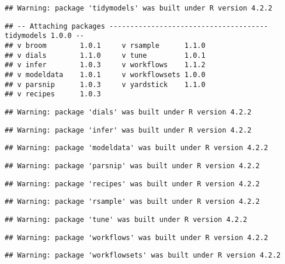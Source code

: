 \documentclass[
]{article}
\begin{document}
\begin{verbatim}
## Warning: package 'tidymodels' was built under R version 4.2.2
\end{verbatim}

\begin{verbatim}
## -- Attaching packages -------------------------------------- tidymodels 1.0.0 --
## v broom        1.0.1     v rsample      1.1.0
## v dials        1.1.0     v tune         1.0.1
## v infer        1.0.3     v workflows    1.1.2
## v modeldata    1.0.1     v workflowsets 1.0.0
## v parsnip      1.0.3     v yardstick    1.1.0
## v recipes      1.0.3
\end{verbatim}

\begin{verbatim}
## Warning: package 'dials' was built under R version 4.2.2
\end{verbatim}

\begin{verbatim}
## Warning: package 'infer' was built under R version 4.2.2
\end{verbatim}

\begin{verbatim}
## Warning: package 'modeldata' was built under R version 4.2.2
\end{verbatim}

\begin{verbatim}
## Warning: package 'parsnip' was built under R version 4.2.2
\end{verbatim}

\begin{verbatim}
## Warning: package 'recipes' was built under R version 4.2.2
\end{verbatim}

\begin{verbatim}
## Warning: package 'rsample' was built under R version 4.2.2
\end{verbatim}

\begin{verbatim}
## Warning: package 'tune' was built under R version 4.2.2
\end{verbatim}

\begin{verbatim}
## Warning: package 'workflows' was built under R version 4.2.2
\end{verbatim}

\begin{verbatim}
## Warning: package 'workflowsets' was built under R version 4.2.2
\end{verbatim}
\end{document}
